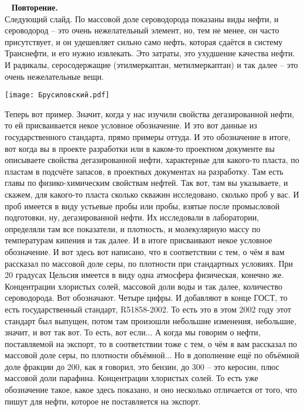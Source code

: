 \documentclass[main.tex]{subfiles}
\begin{document}
\ \newline
\textbf{Повторение.}\\
Следующий слайд.
По массовой доле сероводорода показаны виды нефти, и сероводород -- это очень нежелательный элемент, но, тем не менее, он часто присутствует, и он удешевляет сильно само нефть, которая сдаётся в систему Транснефти, и его нужно извлекать.
Это затраты, это ухудшение качества нефти.
И радикалы, серосодержащие (этилмеркаптан, метилмеркаптан) и так далее -- это очень нежелательные вещи.

\begin{center}
\texttt{[image: Брусиловский.pdf]}
\end{center}

Теперь вот пример.
Значит, когда у нас изучили свойства дегазированной нефти, то ей присваивается некое условное обозначение.
И это вот данные из государственного стандарта, прямо примеры оттуда.
И это обозначение в итоге, вот когда вы в проекте разработки или в каком-то проектном документе вы описываете свойства дегазированной нефти, характерные для какого-то пласта, по пластам в подсчёте запасов, в проектных документах на разработку.
Там есть главы по физико-химическим свойствам нефтей.
Так вот, там вы указываете, и скажем, для какого-то пласта сколько скважин исследовано, сколько проб у вас.
И проб имеется в виду устьевые пробы или пробы, взятые после промысловой подготовки, ну, дегазированной нефти.
Их исследовали в лаборатории, определяли там все показатели, и плотность, и молекулярную массу  по температурам кипения и так далее.
И в итоге присваивают некое условное обозначение.
И вот здесь вот написано, что в соответствии с тем, о чём я вам рассказал по массовой доле серы, по плотности при стандартных условиях.
При 20 градусах Цельсия имеется в виду одна атмосфера физическая, конечно же.
Концентрации хлористых солей, массовой доли воды и так далее, количество сероводорода.
Вот обозначают.
Четыре цифры.
И добавляют в конце ГОСТ, то есть государственный стандарт, R51858-2002.
То есть это в этом 2002 году этот стандарт был выпущен, потом там произошли небольшие изменения, небольшие, значит, и вот так вот.
То есть, вот если...
А когда мы говорим о нефти, поставляемой на экспорт, то в соответствии тоже с тем, о чём я вам рассказал по массовой доле серы, по плотности объёмной...
Но в дополнение ещё по объёмной доле фракции до 200, как я говорил, это бензин, до 300 – это керосин, плюс массовой доли парафина.
Концентрации хлористых солей.
То есть уже обозначение такое, какое здесь показано, и оно несколько отличается от того, что пишут для нефти, которое не поставляется на экспорт.
\end{document}
